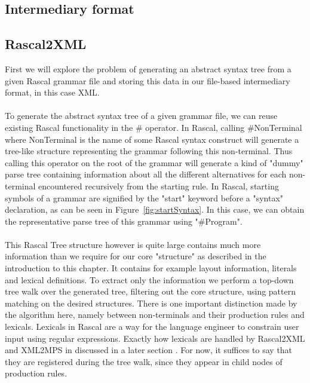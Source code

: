 \documentclass[a4paper]{article}
\begin{document}
\subsection{Intermediary format}

\subsection{Rascal2XML}
First we will explore the problem of generating an abstract syntax tree from a given Rascal grammar file and storing this data in our file-based intermediary format, in this case XML. 
\\\\
To generate the abstract syntax tree of a given grammar file, we can reuse existing Rascal functionality in the \# operator. In Rascal, calling \#NonTerminal where NonTerminal is the name of some Rascal syntax construct will generate a tree-like structure representing the grammar following this non-terminal. Thus calling this operator on the root of the grammar will generate a kind of "dummy" parse tree containing information about all the different alternatives for each non-terminal encountered recursively from the starting rule.  In Rascal, starting symbols of a grammar are signified by the "start" keyword before a "syntax" declaration, as can be seen in Figure~\ref{fig:startSyntax}. In this case, we can obtain the representative parse tree of this grammar using "\#Program". 
\\\\
This Rascal Tree structure however is quite large contains much more information than we require for our core "structure" as described in the introduction to this chapter. It contains for example layout information, literals and  lexical definitions. To extract only the information  we perform a top-down tree walk over the generated tree, filtering out the core structure, using pattern matching on the desired structures. There is one important distinction made by the algorithm here, namely between non-terminals and their production rules and lexicals. Lexicals in Rascal are a way for the language engineer to constrain user input using regular expressions. Exactly how lexicals are handled by Rascal2XML and XML2MPS in discussed in a later section . For now, it suffices to say that they are registered during the tree walk, since they appear in child nodes of production rules. 
\end{document}
